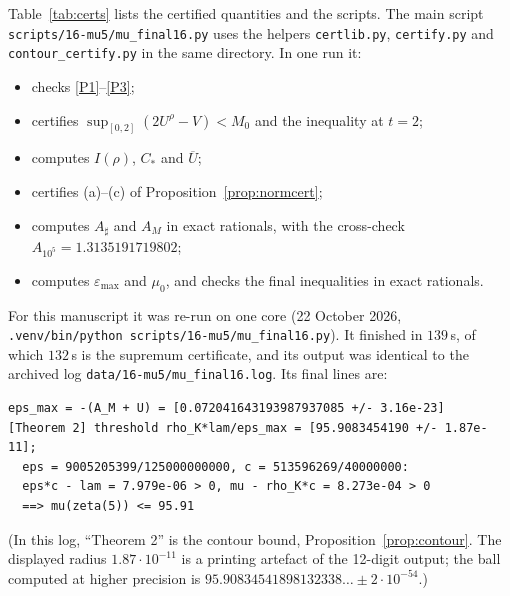 \documentclass[11pt]{article}
\theoremstyle{remark}
\newcommand{\Ubar}{\overline{U}}
\newcommand{\epsmax}{\varepsilon_{\max}}
\newcommand{\file}[1]{\texttt{#1}}
\newcommand{\Cstar}{C_{*}}
\begin{document}
Table~\ref{tab:certs} lists the certified quantities and the scripts. The main script \file{scripts/16-mu5/mu\_final16.py} uses the helpers \file{certlib.py}, \file{certify.py} and \file{contour\_certify.py} in the same directory. In one run it:
\begin{itemize}
\item checks \ref{P1}--\ref{P3};
\item certifies $\sup_{[0,2]}(2U^\rho-V)<M_0$ and the inequality at $t=2$;
\item computes $I(\rho)$, $\Cstar$ and $\Ubar$;
\item certifies (a)--(c) of Proposition~\ref{prop:normcert};
\item computes $A_\sharp$ and $A_M$ in exact rationals, with the cross-check $A_{10^5}=1.3135191719802$;
\item computes $\epsmax$ and $\mu_0$, and checks the final inequalities in exact rationals.
\end{itemize}
For this manuscript it was re-run on one core (22 October 2026, \file{.venv/bin/python scripts/16-mu5/mu\_final16.py}). It finished in $139$\,s, of which $132$\,s is the supremum certificate, and its output was identical to the archived log \file{data/16-mu5/mu\_final16.log}. Its final lines are:
\begin{verbatim}
eps_max = -(A_M + U) = [0.072041643193987937085 +/- 3.16e-23]
[Theorem 2] threshold rho_K*lam/eps_max = [95.9083454190 +/- 1.87e-11];
  eps = 9005205399/125000000000, c = 513596269/40000000:
  eps*c - lam = 7.979e-06 > 0, mu - rho_K*c = 8.273e-04 > 0
  ==> mu(zeta(5)) <= 95.91
\end{verbatim}
(In this log, ``Theorem 2'' is the contour bound, Proposition~\ref{prop:contour}. The displayed radius $1.87\cdot10^{-11}$ is a printing artefact of the 12-digit output; the ball computed at higher precision is $95.90834541898132338\ldots\pm2\cdot10^{-54}$.)
\end{document}
